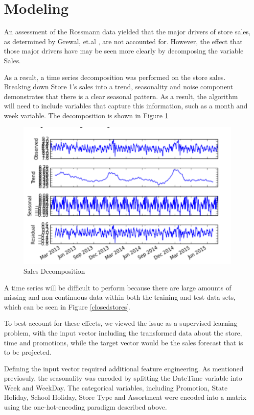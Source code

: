 \documentclass[DIV=calc, paper=a4, fontsize=11pt]{scrartcl}	 %
\begin{document}
\section*{Modeling}

An assessment of the Rossmann data yielded that the major drivers of store sales, as determined by Grewal, et.al \cite{Grewal}, are not accounted for. However, the effect that those major drivers have may be seen more clearly by decomposing the variable Sales. 


As a result, a time series decomposition was performed on the store sales. Breaking down Store 1’s sales into a trend, seasonality and noise component demonstrates that there is a clear seasonal pattern. As a result, the algorithm will need to include variables that capture this information, such as a month and week variable. The decomposition is shown in Figure \ref{store1trend}

\begin{figure}[!htbp]
\centering
\caption{Sales Decomposition}
\label{store1trend}
\includegraphics[scale=0.75]{figures/store1trend.png}
\end{figure} 

A time series will be difficult to perform because there are large amounts of missing and non-continuous data within both the training and test data sets, which can be seen in Figure \ref{closedstores}.

To best account for these effects, we viewed the issue as a supervised learning problem, with the input vector including the transformed data about the store, time and promotions, while the target vector would be the sales forecast that is to be projected. 

Defining the input vector required additional feature engineering. As mentioned previosuly, the seasonality was encoded by splitting the DateTime variable into Week and WeekDay. The categorical variables, including Promotion, State Holiday, School Holiday, Store Type and Assortment were encoded into a matrix using the one-hot-encoding paradigm described above.
\end{document}
